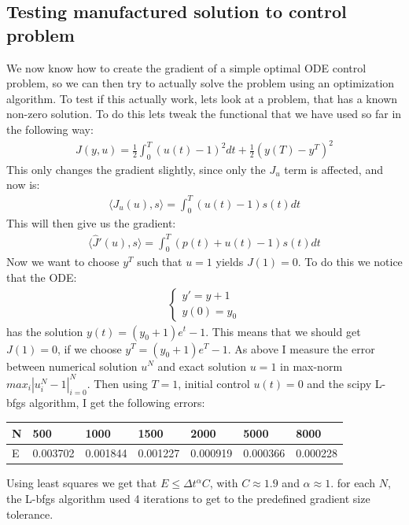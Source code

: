 \documentclass[11pt,a4paper]{article}
\begin{document}
\subsection{Testing manufactured solution to control problem}
We now know how to create the gradient of a simple optimal ODE control problem, so we can then try to actually solve the problem using an optimization algorithm. To test if this actually work, lets look at a problem, that has a known non-zero solution. To do this lets tweak the functional that we have used so far in the following way:
\begin{align*}
J(y,u) = \frac{1}{2}\int_0^T(u(t)-1)^2dt + \frac{1}{2}(y(T)-y^T)^2
\end{align*}
This only changes the gradient slightly, since only the $J_u$ term is affected, and now is:
\begin{align*}
\langle J_u(u),s\rangle = \int_0^T (u(t)-1)s(t) dt
\end{align*}
This will then give us the gradient:
\begin{align*}
\langle\hat{J}'(u),s\rangle = \int_0^T(p(t)+u(t)-1)s(t)dt
\end{align*}
Now we want to choose $y^T$ such that $u=1$ yields $J(1)=0$. To do this we notice that the ODE:
\begin{align*}
\left\{
     \begin{array}{lr}
       	y' =  y +1\\
       	   y(0)=y_0
     \end{array}
   \right.
\end{align*}
has the solution $y(t)=(y_0+1)e^t -1$. This means that we should get $J(1)=0$, if we choose $y^T =  (y_0+1)e^T -1$. As above I measure the error between numerical solution $u^N$ and exact solution $u=1$ in max-norm $max_i{|u^N_i-1|}_{i=0}^N$. Then using $T=1$, initial control $u(t)=0$ and the scipy L-bfgs algorithm, I get the following errors:
\begin{center}
    \begin{tabular}{| l | l | l | l | l | l | l |}
    \hline
    N & 500 & 1000  & 1500 & 2000 & 5000 & 8000 \\ \hline
    E & 0.003702 & 0.001844 &0.001227 & 0.000919 & 0.000366 & 0.000228	\\ \hline
    \end{tabular}
\end{center}
Using least squares we get that $E\leq \Delta t^{\alpha}C$, with $C\approx 1.9$ and $\alpha\approx1$. for each $N$, the L-bfgs algorithm used 4 iterations to get to the predefined gradient size tolerance.
\end{document}
